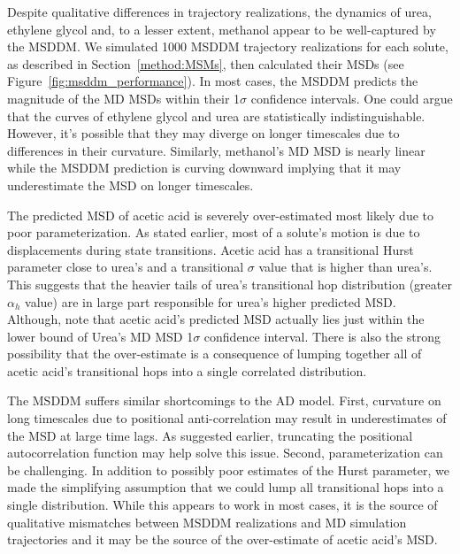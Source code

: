 \documentclass{article}
\begin{document}
  Despite qualitative differences in trajectory realizations, the dynamics of 
  urea, ethylene glycol and, to a lesser extent, methanol appear to be well-captured
  by the MSDDM. We simulated 1000 MSDDM trajectory realizations for each solute, as
  described in Section~\ref{method:MSMs}, then calculated their MSDs (see 
  Figure~\ref{fig:msddm_performance}). In most cases, the MSDDM predicts the magnitude of the MD MSDs 
  within their 1$\sigma$ confidence intervals. One could argue that the curves
  of ethylene glycol and urea are statistically indistinguishable. However, 
  it's possible that they may diverge on longer timescales due to differences
  in their curvature. Similarly, methanol's MD MSD is nearly linear while 
  the MSDDM prediction is curving downward implying that it may underestimate
  the MSD on longer timescales. 
  
  The predicted MSD of acetic acid is severely over-estimated most likely due
  to poor parameterization. 
As stated earlier, most of a solute's motion is 
  due to displacements during state transitions. Acetic acid has a transitional
  Hurst parameter close to urea's and a transitional $\sigma$ value that 
  is higher than urea's. This suggests that the heavier tails of urea's transitional
  hop distribution (greater $\alpha_h$ value) are in large part responsible for 
  urea's higher predicted MSD. Although, note that acetic acid's predicted MSD
  actually lies just within the lower bound of Urea's MD MSD 1$\sigma$ 
  confidence interval. There is also the strong possibility that the over-estimate is
  a consequence of lumping together all of acetic acid's transitional hops into
  a single correlated distribution.
  
  The MSDDM suffers similar shortcomings to the AD model. First, curvature 
  on long timescales due to positional anti-correlation may result in 
  underestimates of the MSD at large time lags. As suggested earlier, truncating
  the positional autocorrelation function may help solve this issue. Second, 
  parameterization can be challenging. In addition to possibly poor estimates 
  of the Hurst parameter, we made the simplifying assumption that we could lump
  all transitional hops into a single distribution. While this appears to work
  in most cases, it is the source of qualitative mismatches between MSDDM
  realizations and MD simulation trajectories and it may be the source of the 
  over-estimate of acetic acid's MSD.
  
\end{document}
